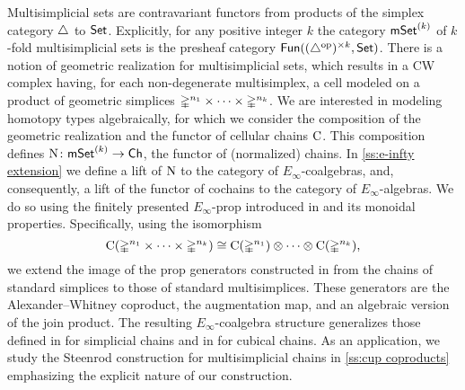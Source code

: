 Multisimplicial sets are contravariant functors from products of the simplex category $\triangle$ to $\mathsf{Set}$.
Explicitly, for any positive integer $k$ the category $\mathsf{mSet}^{(k)}$ of $k$-fold multisimplicial sets is the presheaf category $\mathsf{Fun}((\triangle^{\mathrm{op}})^{\times k}, \mathsf{Set})$.
There is a notion of geometric realization for multisimplicial sets, which results in a CW complex having, for each non-degenerate multisimplex, a cell modeled on a product of geometric simplices $\mathbb{\Delta}^{n_1}\times\dots\times\mathbb{\Delta}^{n_k}$.
We are interested in modeling homotopy types algebraically, for which we consider the composition of the geometric realization and the functor of cellular chains $\operatorname{C}$.
This composition defines $\operatorname{N} \colon \mathsf{mSet}^{(k)} \to \mathsf{Ch}$, the functor of (normalized) chains.
In \cref{ss:e-infty extension} we define a lift of $\operatorname{N}$ to the category of $E_\infty$-coalgebras, and, consequently, a lift of the functor of cochains to the category of $E_\infty$-algebras.
We do so using the finitely presented $E_\infty$-prop introduced in \cite{medina2020prop1} and its monoidal properties.
Specifically, using the isomorphism
\[
\operatorname{C}(\mathbb{\Delta}^{n_1}\times\dots\times\mathbb{\Delta}^{n_k}) \cong
\operatorname{C}(\mathbb{\Delta}^{n_1}) \otimes\dotsb\otimes \operatorname{C}(\mathbb{\Delta}^{n_k}),
\]
we extend the image of the prop generators constructed in \cite{medina2020prop1} from the chains of standard simplices to those of standard multisimplices.
These generators are the Alexander--Whitney coproduct, the augmentation map, and an algebraic version of the join product.
The resulting $E_\infty$-coalgebra structure generalizes those defined in \cite{mcclure2003multivariable, berger2004combinatorial, medina2020prop1} for simplicial chains and in \cite{medina2022cube_einfty} for cubical chains.
As an application, we study the Steenrod construction for multisimplicial chains in \cref{ss:cup coproducts} emphasizing the explicit nature of our construction.

